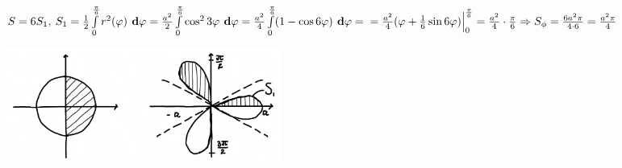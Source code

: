 \documentclass[a4paper,12pt, centered]{bookest}
\theoremstyle{remark}
\newcommand\dy{\textbf{ d}}
\begin{document}
\begin{enumerate}
\begin{example}
\begin{enumerate}
				\end{enumerate} $S=6S_1,\>S_1=\frac12\int\limits_0^\frac\pi6r^2(\varphi)\dy \varphi=\frac{a^2}2\int\limits_0^\frac\pi6\cos^23\varphi\dy\varphi=\frac{a^2}4\int\limits_0^\frac\pi6(1-\cos6\varphi)\dy\varphi=\\=\frac{a^2}4(\varphi+\frac16\sin6\varphi)\Big|_0^{\frac{\pi}6}=\frac{a^2}4\cdot\frac\pi6\Rightarrow S_\phi=\frac{6a^2\pi}{4\cdot 6}=\frac{a^2\pi}4$
				\begin{center}
					\includegraphics[width=9cm]{2_9_2_13}
				\end{center}
			\end{example}
\end{enumerate}
\end{document}
